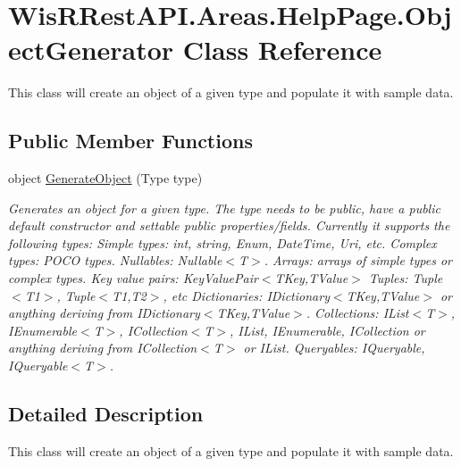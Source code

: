\hypertarget{class_wis_r_rest_a_p_i_1_1_areas_1_1_help_page_1_1_object_generator}{}\section{Wis\+R\+Rest\+A\+P\+I.\+Areas.\+Help\+Page.\+Object\+Generator Class Reference}
\label{class_wis_r_rest_a_p_i_1_1_areas_1_1_help_page_1_1_object_generator}


This class will create an object of a given type and populate it with sample data.  


\subsection*{Public Member Functions}
\begin{DoxyCompactItemize}
\item 
object \hyperlink{class_wis_r_rest_a_p_i_1_1_areas_1_1_help_page_1_1_object_generator_a33b690209a8997bfb43ca29676c03b70}{Generate\+Object} (Type type)
\begin{DoxyCompactList}\small\item\em Generates an object for a given type. The type needs to be public, have a public default constructor and settable public properties/fields. Currently it supports the following types\+: Simple types\+: int, string, Enum, Date\+Time, Uri, etc. Complex types\+: P\+O\+C\+O types. Nullables\+: Nullable$<$\+T$>$. Arrays\+: arrays of simple types or complex types. Key value pairs\+: Key\+Value\+Pair$<$\+T\+Key,\+T\+Value$>$ Tuples\+: Tuple$<$\+T1$>$, Tuple$<$\+T1,\+T2$>$, etc Dictionaries\+: I\+Dictionary$<$\+T\+Key,\+T\+Value$>$ or anything deriving from I\+Dictionary$<$\+T\+Key,\+T\+Value$>$. Collections\+: I\+List$<$\+T$>$, I\+Enumerable$<$\+T$>$, I\+Collection$<$\+T$>$, I\+List, I\+Enumerable, I\+Collection or anything deriving from I\+Collection$<$\+T$>$ or I\+List. Queryables\+: I\+Queryable, I\+Queryable$<$\+T$>$. \end{DoxyCompactList}\end{DoxyCompactItemize}


\subsection{Detailed Description}
This class will create an object of a given type and populate it with sample data. 



